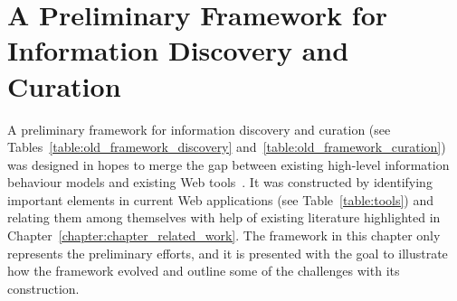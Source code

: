 \chapter{A Preliminary Framework for Information Discovery and Curation}
\label{chapter:old_framework}
A preliminary framework for information discovery and curation (see Tables~\ref{table:old_framework_discovery} and~\ref{table:old_framework_curation}) was designed in hopes to merge the gap between existing high-level information behaviour models and existing Web tools~\cite{voyloshnikova2014}. It was constructed by identifying important elements in current Web applications (see Table~\ref{table:tools}) and relating them among themselves with help of existing literature highlighted in Chapter~\ref{chapter:chapter_related_work}. The framework in this chapter only represents the preliminary efforts, and it is presented with the goal to illustrate how the framework evolved and outline some of the challenges with its construction.  

